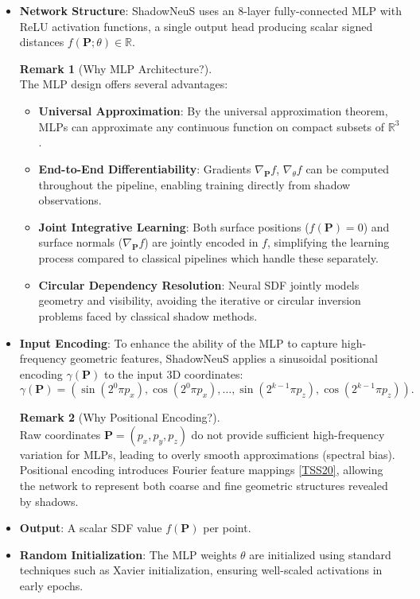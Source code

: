 \documentclass[12pt,a4paper]{article}
\theoremstyle{definition}
\newtheorem{remark}{Remark}[subsection]
\begin{document}
\begin{itemize}

    \item \textbf{Network Structure}: ShadowNeuS uses an 8-layer fully-connected MLP with ReLU activation functions, a single output head producing scalar signed distances $f(\mathbf{P}; \theta) \in \mathbb{R}$.

    \begin{remark}[Why MLP Architecture?] ~\\
    The MLP design offers several advantages:
    \begin{itemize}
        \item \textbf{Universal Approximation}: By the universal approximation theorem, MLPs can approximate any continuous function on compact subsets of $\mathbb{R}^3$.
        \item \textbf{End-to-End Differentiability}: Gradients $\nabla_{\mathbf{P}} f$, $\nabla_{\theta} f$ can be computed throughout the pipeline, enabling training directly from shadow observations.
        \item \textbf{Joint Integrative Learning}: Both surface positions ($f(\mathbf{P}) = 0$) and surface normals ($\nabla_{\mathbf{P}} f$) are jointly encoded in $f$, simplifying the learning process compared to classical pipelines which handle these separately.
        \item \textbf{Circular Dependency Resolution}: Neural SDF jointly models geometry and visibility, avoiding the iterative or circular inversion problems faced by classical shadow methods.
    \end{itemize}
    \end{remark}

    \item \textbf{Input Encoding}: To enhance the ability of the MLP to capture high-frequency geometric features, ShadowNeuS applies a sinusoidal positional encoding $\gamma(\mathbf{P})$ to the input 3D coordinates:
    \begin{equation}
    \gamma(\mathbf{P}) = \left( \sin(2^0 \pi p_x), \cos(2^0 \pi p_x), \ldots, \sin(2^{k-1} \pi p_z), \cos(2^{k-1} \pi p_z) \right).
    \end{equation}

    \begin{remark}[Why Positional Encoding?] ~\\
    Raw coordinates $\mathbf{P} = (p_x, p_y, p_z)$ do not provide sufficient high-frequency variation for MLPs, leading to overly smooth approximations (spectral bias). Positional encoding introduces Fourier feature mappings \hyperlink{[TSS20]}{[TSS20]}, allowing the network to represent both coarse and fine geometric structures revealed by shadows.
    \end{remark}

    \item \textbf{Output}: A scalar SDF value $f(\mathbf{P})$ per point.

    \item \textbf{Random Initialization}: The MLP weights $\theta$ are initialized using standard techniques such as Xavier initialization, ensuring well-scaled activations in early epochs.
\end{itemize}
\end{document}
